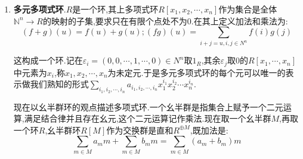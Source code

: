 \begin{enumerate}
\begin{enumerate}
\begin{proof}
			反过来,取定交换环$R$上的多项式$f=a_0+a_1x+\cdots+a_nx^n$,设它是单位,设逆元为$g=b_0+b_1x+\cdots+b_mx^m$,那么按照$fg=1$,得到$a_0b_0=1$,于是$a_0$是单位.为了证明$a_1,\cdots,a_n$都是幂零元,只要说明$a_n$是幂零元,据此得到$-a_nx^n$是幂零元,于是$f-a_nx^n=a_0+a_1x+\cdots+a_{n-1}x^{n-1}$也是单位,这就可以归纳说明$a_1,\cdots,a_n$都是幂零元.
			
			考虑$fg=1$的最高次项,得到$a_nb_m=0$,考虑第二高次项,得到$a_nb_{m-1}+a_{n-1}b_m=0$,两边乘以$a_n$得到$a_n^2b_{m-1}=0$,归纳得到$a_n^{r+1}b_{m-r}=0$,于是有$a_n^{m+1}b_0=0$,按照$b_0$是单位就得到$a_n^{m+1}=0$.
		\end{proof}
		\item 幂零元.$f=a_0+a_1x+\cdots+a_nx^n$是幂零元当且仅当$a_0,a_1,\cdots,a_n$都是幂零元.
		\begin{proof}
			一方面按照幂零元的和是幂零元,说明$a_0,a_1,\cdots,a_n$是幂零元的时候$f$是幂零元.另一方面,如果$f$是幂零元,那么$a_0$本身必然是幂零元.按照上一个证明中我们所用的幂零元加单位是单位,于是$f+1$是单位,于是再利用上一段结论得到$a_1,\cdots,a_n$都是幂零元.
		\end{proof}
		\item 零因子.$R$上多项式$f=a_0+a_1x+\cdots+a_nx^n$是左零因子,当且仅当存在$R$中非0元$b$零化了$f(x)$的全部系数.
		\begin{proof}
			设$g=b_0+b_1x+\cdots+b_mx^m$是次数最小的非零多项式满足$fg=0$,于是得到$a_nb_m=0$,那么我们断言$a_ng=0$,否则$a_ng$是一个次数比$g$更小的非零多项式满足$a_ngf=0$.于是$a_n$零化了所有$b_i$.于是有$f_1=a_0+a_1x+\cdots+a_{n-1}x^{n-1}$满足$f_1g=0$,那么$a_{n-1}b_m=0$,我们断言$a_{n-1}g=0$,否则$a_{n-1}g$是一个次数比$g$更小的非零多项式满足$a_{n-1}gf=0$,归纳下去,我们看到总有$a_ib_j=0,\forall 0\le i\le n,0\le j\le m$.于是$b_i$中的非零元就零化了$f$.
		\end{proof}
	\end{enumerate}
	\item \textbf{多元多项式环}.$R$是一个环,其上多项式环$R[x_1,x_2,\cdots,x_n]$作为集合是全体$\mathbb{N}^n\to R$的映射的子集,要求只在有限个点处不为0.在其上定义加法和乘法为:
	$$(f+g)(u)=f(u)+g(u);(fg)(u)=\sum_{i+j=u,i,j\in N^n}f(i)g(j)$$
	
	这构成一个环.记在$\varepsilon_i=(0,0,\cdots,1,\cdots,0)\in N^n$取$1_R$,其余$\varepsilon_j$取0的$R[x_1,\cdots,x_n]$中元素为$x_i$,称$x_1,x_2,\cdots,x_n$为未定元.于是多元多项式环的每个元可以唯一的表示做我们熟知的形式$\sum_{i_1,i_2,\cdots,i_n}a_{i_1,i_2,\cdots,i_n}x_1^{i_1}x_2^{i_2}\cdots x_n^{i_n}$.
	
	现在以幺半群环的观点描述多项式环.一个幺半群是指集合上赋予一个二元运算,满足结合律并且存在幺元,这个二元运算记作乘法.现在取一个幺半群$M$,再取一个环$R$,幺半群环$R[M]$作为交换群是直和$R^{\oplus M}$,既加法是:
	$$\sum_{m\in M}a_mm+\sum_{m\in M}b_mm=\sum_{m\in M}(a_m+b_m)m$$
	

\end{enumerate}
